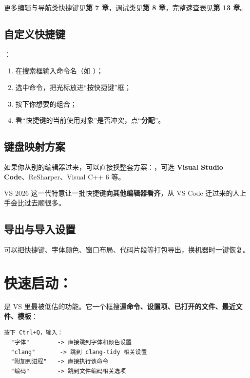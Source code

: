 更多编辑与导航类快捷键见\textbf{第 7 章}，调试类见\textbf{第 8 章}，完整速查表见\textbf{第 13 章}。

\subsection{自定义快捷键}

：

\begin{enumerate}
	\item 在搜索框输入命令名（如 ）；
	\item 选中命令，把光标放进“按快捷键”框；
	\item 按下你想要的组合；
	\item 看“快捷键的当前使用对象”是否冲突，点“\textbf{分配}”。
\end{enumerate}

\subsection{键盘映射方案}

如果你从别的编辑器过来，可以直接换整套方案：，可选 \textbf{Visual Studio Code}、ReSharper、Visual C++ 6 等。

\begin{tipbox}[提示]
VS 2026 这一代特意让一批快捷键\textbf{向其他编辑器看齐}，从 VS Code 迁过来的人上手会比过去顺很多。
\end{tipbox}

\subsection{导出与导入设置}

 可以把快捷键、字体颜色、窗口布局、代码片段等打包导出，换机器时一键恢复。

\section{快速启动：}

\textbf{} 是 VS 里最被低估的功能。它一个框搜遍\textbf{命令、设置项、已打开的文件、最近文件、模板}：

\begin{lstlisting}[style=textstyle]
按下 Ctrl+Q，输入：
  "字体"        -> 直接跳到字体和颜色设置
  "clang"       -> 跳到 clang-tidy 相关设置
  "附加到进程"   -> 直接执行该命令
  "编码"        -> 跳到文件编码相关选项
\end{lstlisting}

